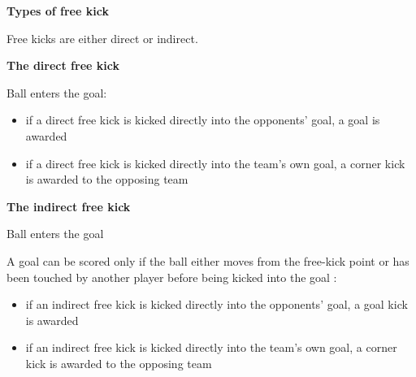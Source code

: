 \clearpage
\sffamily
{\bfseries\color[rgb]{0.4,0.4,0.4}{Law 13 -- Free Kicks} }
{}

\bigskip

{\bfseries Types of free kick}

\headlinebox

Free kicks are either direct or indirect.

\bigskip

{\bfseries The direct free kick }

\headlinebox

Ball enters the goal:

\begin{itemize}
\item if a direct free kick is kicked directly into the
opponents{\textquoteright} goal, a goal is awarded
\item if a direct free kick is kicked directly into the team's own goal, a corner kick is awarded to the opposing team
\end{itemize}

\bigskip

{\bfseries The indirect free kick}

\headlinebox



\bigskip

Ball enters the goal

A goal can be scored only if the ball  either  moves  \removed{20 cm} from the free-kick point or has been touched by another player before being kicked into the goal :

\begin{itemize}
\item if an indirect free kick is kicked directly into the
opponents' goal, a goal kick is awarded
\item if an indirect free kick is kicked directly into the
team's own goal, a corner kick is awarded to the
opposing team
\end{itemize}

\bigskip

